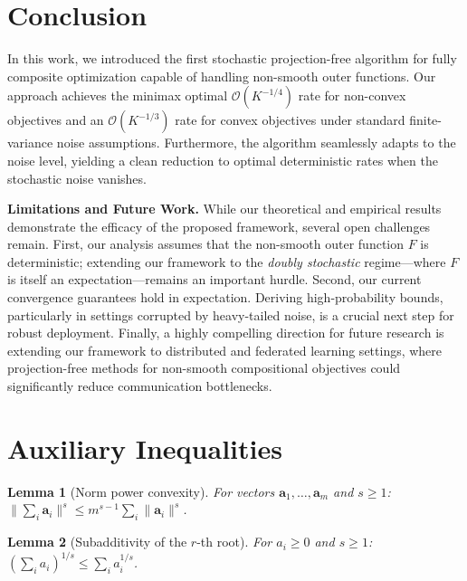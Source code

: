 \documentclass{article}
\def\va{{\bm{a}}}
\newtheorem{lemma}{Lemma}
\begin{document}
\section{Conclusion}
In this work, we introduced the first stochastic projection-free algorithm for fully composite optimization capable of handling non-smooth outer functions. Our approach achieves the minimax optimal $\mathcal{O}(K^{-1/4})$ rate for non-convex objectives and an $\mathcal{O}(K^{-1/3})$ rate for convex objectives under standard finite-variance noise assumptions. Furthermore, the algorithm seamlessly adapts to the noise level, yielding a clean reduction to optimal deterministic rates when the stochastic noise vanishes. 

\textbf{Limitations and Future Work.}
While our theoretical and empirical results demonstrate the efficacy of the proposed framework, several open challenges remain. First, our analysis assumes that the non-smooth outer function $F$ is deterministic; extending our framework to the \textit{doubly stochastic} regime—where $F$ is itself an expectation—remains an important hurdle. Second, our current convergence guarantees hold in expectation. Deriving high-probability bounds, particularly in settings corrupted by heavy-tailed noise, is a crucial next step for robust deployment. Finally, a highly compelling direction for future research is extending our framework to distributed and federated learning settings, where projection-free methods for non-smooth compositional objectives could significantly reduce communication bottlenecks.




\newpage
\appendix

\section{Auxiliary Inequalities} \label{sec:auxiliary}

\begin{lemma}[Norm power convexity] \label{lem:norm_convex}
For vectors $\va_1, \ldots, \va_m$ and $s \ge 1$: $\|\sum_i \va_i\|^s \le m^{s-1} \sum_i \|\va_i\|^s$.
\end{lemma}

\begin{lemma}[Subadditivity of the $r$-th root] \label{lem:subadd}
For $a_i \ge 0$ and $s \ge 1$: $(\sum_i a_i)^{1/s} \le \sum_i a_i^{1/s}$.
\end{lemma}
\end{document}
